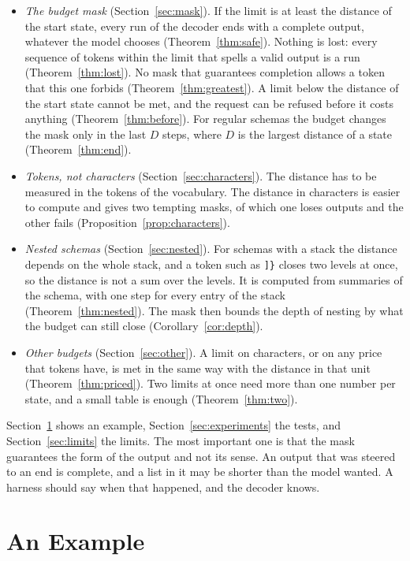\documentclass[acmsmall,nonacm,screen]{acmart}
\newcommand{\str}[1]{\texttt{#1}}
\begin{document}
\begin{itemize}
\item \emph{The budget mask} (Section~\ref{sec:mask}). If the limit is at least the distance
  of the start state, every run of the decoder ends with a complete output, whatever the
  model chooses (Theorem~\ref{thm:safe}). Nothing is lost: every sequence of tokens within
  the limit that spells a valid output is a run (Theorem~\ref{thm:lost}). No mask that
  guarantees completion allows a token that this one forbids (Theorem~\ref{thm:greatest}). A
  limit below the distance of the start state cannot be met, and the request can be refused
  before it costs anything (Theorem~\ref{thm:before}). For regular schemas the budget changes
  the mask only in the last $D$ steps, where $D$ is the largest distance of a state
  (Theorem~\ref{thm:end}).
\item \emph{Tokens, not characters} (Section~\ref{sec:characters}). The distance has to be
  measured in the tokens of the vocabulary. The distance in characters is easier to compute
  and gives two tempting masks, of which one loses outputs and the other fails
  (Proposition~\ref{prop:characters}).
\item \emph{Nested schemas} (Section~\ref{sec:nested}). For schemas with a stack the
  distance depends on the whole stack, and a token such as \str{]\}} closes two levels at
  once, so the distance is not a sum over the levels. It is computed from summaries of the
  schema, with one step for every entry of the stack (Theorem~\ref{thm:nested}). The mask
  then bounds the depth of nesting by what the budget can still close
  (Corollary~\ref{cor:depth}).
\item \emph{Other budgets} (Section~\ref{sec:other}). A limit on characters, or on any price
  that tokens have, is met in the same way with the distance in that unit
  (Theorem~\ref{thm:priced}). Two limits at once need more than one number per state, and a
  small table is enough (Theorem~\ref{thm:two}).
\end{itemize}

Section~\ref{sec:example} shows an example, Section~\ref{sec:experiments} the tests, and
Section~\ref{sec:limits} the limits. The most important one is that the mask guarantees the
form of the output and not its sense. An output that was steered to an end is complete, and
a list in it may be shorter than the model wanted. A harness should say when that happened,
and the decoder knows.

\section{An Example}\label{sec:example}
\end{document}
